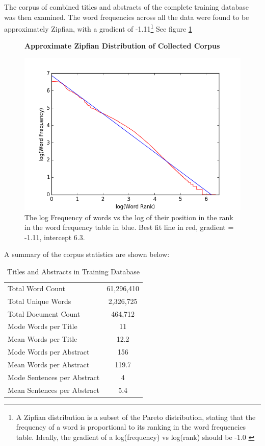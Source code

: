 The corpus of combined titles and abstracts of the complete training database was then examined. The word frequencies across all the data were found to be approximately Zipfian, with a gradient of -1.11\footnote{A Zipfian distribution is a subset of the Pareto distribution, stating that the frequency of a word is proportional to its ranking in the word frequencies table. Ideally, the gradient of a log(frequency) vs log(rank) should be -1.0 \cite{zipf}} See figure \ref{fig:ZIPF}
\begin{figure}[H]
    \centering
    \textbf{Approximate Zipfian Distribution of Collected Corpus}\par\medskip
    \includegraphics[scale=0.6]{Data_Acquisition/zipf.png}
    \caption[Zipfian Plot of Collected Corpus]{The log Frequency of words vs the log of their position in the rank in the word frequency table in blue. Best fit line in red, gradient = -1.11, intercept 6.3. }
     \label{fig:ZIPF}
\end{figure}
A summary of the corpus statistics are shown below:
\begin{table}[h!]
\caption{Titles and Abstracts in Training Database}
\label{tab:CORPUS STATS}
\begin{center}
\begin{tabular}{||l|c||}
\hline
Total Word Count & 61,296,410\\
Total Unique Words & 2,326,725\\
Total Document Count & 464,712\\
Mode Words per Title &  11\\
Mean Words per Title &  12.2\\
Mode Words per Abstract & 156\\
Mean Words per Abstract & 119.7\\
Mode Sentences per Abstract & 4\\
Mean Sentences per Abstract & 5.4\\
\hline
\end{tabular}
\end{center}
\end{table}

\label{sec:SCRAPEANALYSIS}

